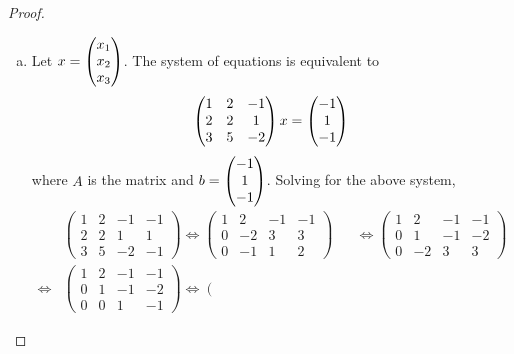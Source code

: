 \begin{proof}
    \renewcommand{\qedsymbol}{$\blacksquare$}
    \begin{enumerate}[(a)]
        \item Let $x=\begin{pmatrix} x_1\\ x_2\\ x_3\end{pmatrix}$.
        The system of equations is equivalent to 
        \[
            \begin{aligned}
                \begin{pmatrix}
                    1 & 2 & -1 \\
                    2 & 2 & 1 \\
                    3 & 5 & -2
                \end{pmatrix}x=\begin{pmatrix} -1\\ 1\\ -1\end{pmatrix}
            \end{aligned}
        \]
        where $A$ is the matrix and $b=\begin{pmatrix} -1\\ 1\\ -1\end{pmatrix}$.
        Solving for the above system,
        \[
        \begin{aligned}
        &\left(
            \begin{array}{ccc|c}
                1 & 2 & -1 & -1\\
                2 & 2 & 1 & 1\\
                3 & 5 & -2 & -1
            \end{array}
        \right)
        \Leftrightarrow
        \left(
            \begin{array}{ccc|c}
                1 & 2 & -1 & -1\\
                0 & -2 & 3 & 3\\
                0 & -1 & 1 & 2
            \end{array}
        \right)
        &&\Leftrightarrow
        \left(
            \begin{array}{ccc|c}
                1 & 2 & -1 & -1\\
                0 & 1 & -1 & -2\\
                0 & -2 & 3 & 3
            \end{array}
        \right)
        \\
        \Leftrightarrow
        &\left(
            \begin{array}{ccc|c}
                1 & 2 & -1 & -1\\
                0 & 1 & -1 & -2\\
                0 & 0 & 1 & -1
            \end{array}
        \right)
        \Leftrightarrow
        \left(
            \begin{array}{ccc|c}

\end{array}
\end{aligned}\]
\end{enumerate}
\end{proof}
